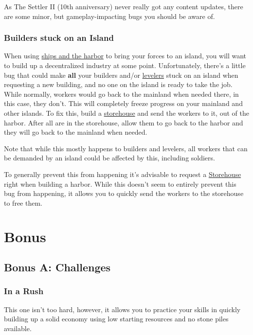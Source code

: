\documentclass[12pt]{article}
\begin{document}
As The Settler II (10th anniversary) never really got any content updates, there are some minor, but gameplay-impacting bugs you should be aware of.

\subsubsection{Builders stuck on an Island}
\label{sec:buildersstuckonisland}

When using \hyperref[sec:shipsandharbor]{ships and the harbor} to bring your forces to an island, you will want to build up a decentralized industry at some point. Unfortunately, there's a little bug that could make \textbf{all} your builders and/or \hyperref[sec:leveler]{levelers} stuck on an island when requesting a new building, and no one on the island is ready to take the job. While normally, workers would go back to the mainland when needed there, in this case, they don't. This will completely freeze progress on your mainland and other islands. To fix this, build a \hyperref[sec:storehouse]{storehouse} and send the workers to it, out of the harbor. After all are in the storehouse, allow them to go back to the harbor and they will go back to the mainland when needed.

Note that while this mostly happens to builders and levelers, all workers that can be demanded by an island could be affected by this, including soldiers.

To generally prevent this from happening it's advisable to request a \hyperref[sec:storehouse]{Storehouse} right when building a harbor. While this doesn't seem to entirely prevent this bug from happening, it allows you to quickly send the workers to the storehouse to free them.

\section{Bonus}
\label{sec:bonus}

\subsection{Bonus A: Challenges}
\label{sec:challenges}

\subsubsection{In a Rush}
\label{sec:challenge_rush}

This one isn't too hard, however, it allows you to practice your skills in quickly building up a solid economy using low starting resources and no stone piles available.
\end{document}
